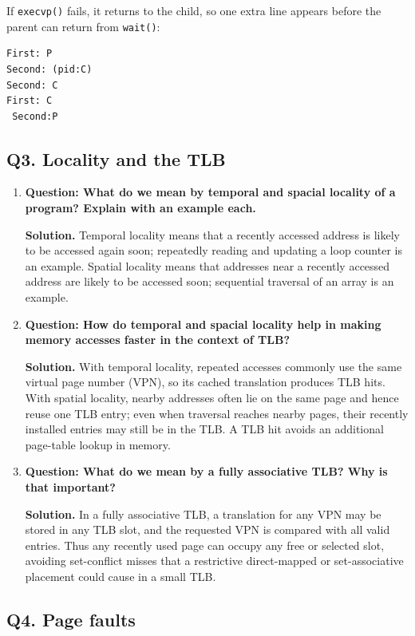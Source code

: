If \texttt{execvp()} fails, it returns to the child, so one extra line appears
before the parent can return from \texttt{wait()}:
\begin{verbatim}
First: P
Second: (pid:C)
Second: C
First: C
 Second:P
\end{verbatim}

\subsection*{Q3. Locality and the TLB}

\begin{enumerate}
\item[(i)] \textbf{Question: What do we mean by temporal and spacial locality
of a program? Explain with an example each.}

\textbf{Solution.}
Temporal locality means that a recently accessed address is likely to be
accessed again soon; repeatedly reading and updating a loop counter is an
example. Spatial locality means that addresses near a recently accessed
address are likely to be accessed soon; sequential traversal of an array is an
example.

\item[(ii)] \textbf{Question: How do temporal and spacial locality help in
making memory accesses faster in the context of TLB?}

\textbf{Solution.}
With temporal locality, repeated accesses commonly use the same virtual page
number (VPN), so its cached translation produces TLB hits. With spatial
locality, nearby addresses often lie on the same page and hence reuse one TLB
entry; even when traversal reaches nearby pages, their recently installed
entries may still be in the TLB. A TLB hit avoids an additional page-table
lookup in memory.

\item[(iii)] \textbf{Question: What do we mean by a fully associative TLB? Why
is that important?}

\textbf{Solution.}
In a fully associative TLB, a translation for any VPN may be stored in any TLB
slot, and the requested VPN is compared with all valid entries. Thus any
recently used page can occupy any free or selected slot, avoiding
set-conflict misses that a restrictive direct-mapped or set-associative
placement could cause in a small TLB.
\end{enumerate}

\subsection*{Q4. Page faults}

